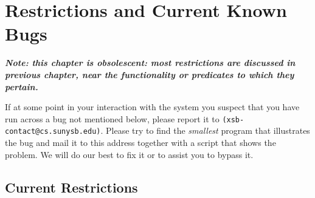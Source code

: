 \chapter{Restrictions and Current Known Bugs}

{\bf {\em Note: this chapter is obsolescent: most restrictions are
    discussed in previous chapter, near the functionality or
    predicates to which they pertain.}}

If at some point in your interaction with the system you suspect that
you have run across a bug not mentioned below, please report it to
{\tt (xsb-contact@cs.sunysb.edu)}.  Please try to find the {\em
smallest} program that illustrates the bug and mail it to this address
together with a script that shows the problem.  We will do our best to
fix it or to assist you to bypass it.

\section{Current Restrictions}
\label{sec:CurrentRestrictions}

